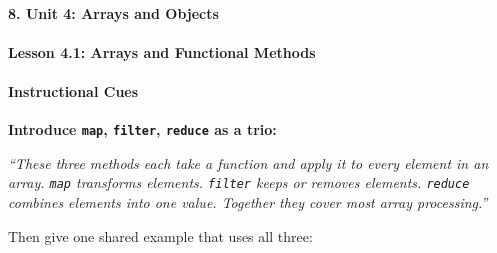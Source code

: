\documentclass[
  justified,
  openright,
]{tufte-book}
\let\subsection\paragraph
\let\paragraph\paragraph
\let\subsection\paragraph
\let\paragraph\paragraph
\begin{document}
\subsection{8. Unit 4: Arrays and
Objects}\label{unit-4-arrays-and-objects}

\subsection{Lesson 4.1: Arrays and Functional
Methods}\label{lesson-4.1-arrays-and-functional-methods}

\paragraph{Instructional Cues}\label{instructional-cues-15}

\textbf{Introduce \texttt{map}, \texttt{filter}, \texttt{reduce} as a
trio:}



\emph{``These three methods each take a function and apply it to every
element in an array. \texttt{map} transforms elements. \texttt{filter}
keeps or removes elements. \texttt{reduce} combines elements into one
value. Together they cover most array processing.''}

Then give one shared example that uses all three:
\end{document}
